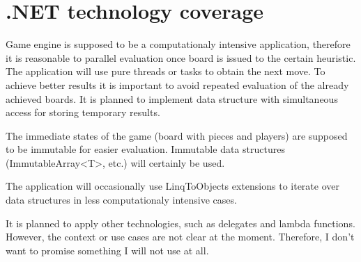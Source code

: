 \section{.NET technology coverage}

Game engine is supposed to be a computationaly intensive application,
therefore it is reasonable to parallel evaluation once board is issued to the
certain heuristic. The application will use pure threads or tasks to obtain
the next move. To achieve better results it is important to avoid repeated
evaluation of the already achieved boards. It is planned to implement data
structure with simultaneous access for storing temporary results.

\vspace{0.5em}

The immediate states of the game (board with pieces and players) are supposed
to be immutable for easier evaluation. Immutable data structures
(\textsf{ImmutableArray}\textless \textsf{T}\textgreater, etc.) will certainly
be used.

\vspace{0.5em}

The application will occasionally use LinqToObjects extensions to iterate
over data structures in less computationaly intensive cases.

\vspace{0.5em}

It is planned to apply other technologies, such as delegates and lambda
functions. However, the context or use cases are not clear at the moment.
Therefore, I don't want to promise something I will not use at all.
